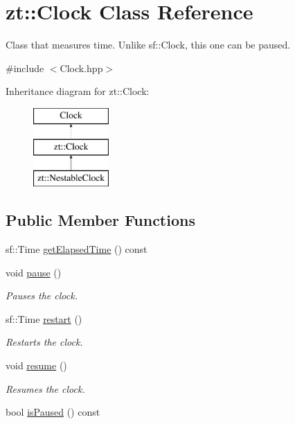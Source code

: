 \hypertarget{classzt_1_1_clock}{}\section{zt\+:\+:Clock Class Reference}
\label{classzt_1_1_clock}


Class that measures time. Unlike sf\+::\+Clock, this one can be paused.  




{\ttfamily \#include $<$Clock.\+hpp$>$}

Inheritance diagram for zt\+:\+:Clock\+:\begin{figure}[H]
\begin{center}
\leavevmode
\includegraphics[height=3.000000cm]{classzt_1_1_clock}
\end{center}
\end{figure}
\subsection*{Public Member Functions}
\begin{DoxyCompactItemize}
\item 
sf\+::\+Time \hyperlink{classzt_1_1_clock_a7cd9408d376156ed1ef710ebdeed2615}{get\+Elapsed\+Time} () const
\item 
\mbox{\label{classzt_1_1_clock_a58515712a76981f8cbbb4de15ea01198}} 
void \hyperlink{classzt_1_1_clock_a58515712a76981f8cbbb4de15ea01198}{pause} ()
\begin{DoxyCompactList}\small\item\em Pauses the clock. \end{DoxyCompactList}\item 
sf\+::\+Time \hyperlink{classzt_1_1_clock_a25742e0b8d93ed9d9a03f1ebc01edd76}{restart} ()
\begin{DoxyCompactList}\small\item\em Restarts the clock. \end{DoxyCompactList}\item 
\mbox{\label{classzt_1_1_clock_a5bc290d15ca92741d073e1b96014ad45}} 
void \hyperlink{classzt_1_1_clock_a5bc290d15ca92741d073e1b96014ad45}{resume} ()
\begin{DoxyCompactList}\small\item\em Resumes the clock. \end{DoxyCompactList}\item 
bool \hyperlink{classzt_1_1_clock_ad9ec39488832c24128d8b6af3b20fc80}{is\+Paused} () const
\end{DoxyCompactItemize}


